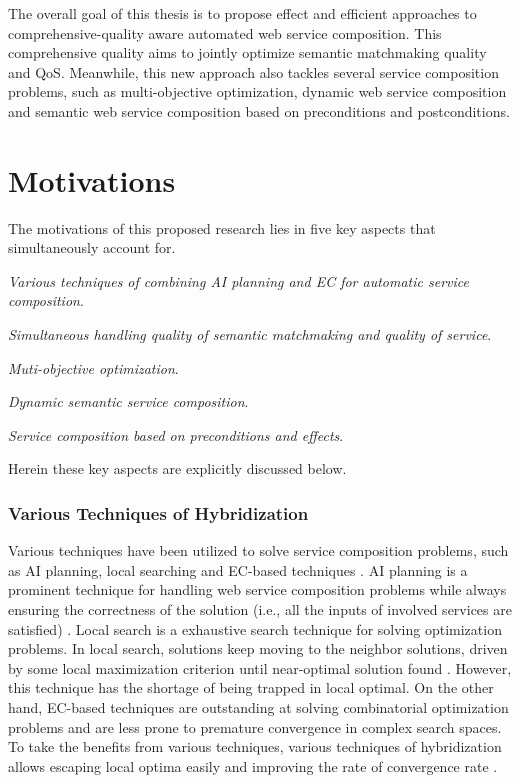 The overall goal of this thesis is to propose effect and efficient approaches to comprehensive-quality aware automated web service composition. This comprehensive quality aims to jointly optimize semantic matchmaking quality and QoS. Meanwhile, this new approach also tackles several service composition problems, such as multi-objective optimization, dynamic web service composition and semantic web service composition based on preconditions and postconditions.

\section{Motivations}\label{C:motivation}
The motivations of this proposed research lies in five key aspects that simultaneously account for. 
\begin{enumerate*}
 \item \emph{Various techniques of combining AI planning and EC for automatic service composition}.
 \item \emph{Simultaneous handling quality of semantic matchmaking and quality of service}.
 \item \emph{Muti-objective optimization}.
 \item \emph{Dynamic semantic service composition}.
 \item \emph{Service composition based on preconditions and effects}.
\end{enumerate*}
Herein these key aspects are explicitly discussed below. 
\subsubsection{Various Techniques of Hybridization}

Various techniques have been utilized to solve service composition problems, such as AI planning, local searching and EC-based techniques \cite{feng2013dynamic,parejo2008qos,qi2010combining,wang2014automated}. AI planning is a prominent technique for handling web service composition problems while always ensuring the correctness of the solution (i.e., all the inputs of involved services are satisfied) \cite{wang2014automated}.  Local search is a exhaustive search technique for solving optimization problems. In local search, solutions keep moving to the neighbor solutions, driven by some local maximization criterion until near-optimal solution found \cite{parejo2008qos}. However, this technique has the shortage of being trapped in local optimal. On the other hand, EC-based techniques are outstanding at solving combinatorial optimization problems and are less prone to premature convergence in complex search spaces. To take the benefits from various techniques,  various techniques of hybridization allows escaping local optima easily and improving the rate of convergence rate \cite{renders1996hybrid}.

